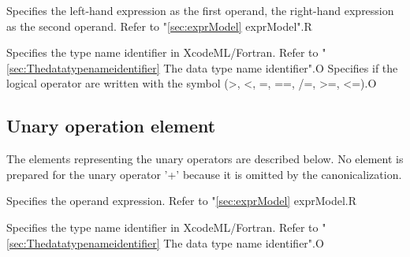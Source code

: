 
\begin{XcodeMLChildElements}
{Specifies the left-hand expression as the first operand, the right-hand expression as the second operand. Refer to "\ref{sec:exprModel} exprModel".}{R}
\end{XcodeMLChildElements}

\begin{XcodeMLAttributes}
{Specifies the type name identifier in XcodeML/Fortran.
 Refer to "\ref{sec:Thedatatypenameidentifier} The data type name identifier".}{O}
{Specifies if the logical operator are written with the symbol 
(>, <, =, ==, /=, >=, <=).}{O}
\end{XcodeMLAttributes}


\subsection{Unary operation element}

The elements representing the unary operators are described below.
No element is prepared for the unary operator '+' because it is omitted by the canonicalization.
\newline

\begin{XcodeMLOperations}
\end{XcodeMLOperations}


\begin{XcodeMLChildElements}
{Specifies the operand expression. Refer to "\ref{sec:exprModel} exprModel.}{R}
\end{XcodeMLChildElements}

\begin{XcodeMLAttributes}
{Specifies the type name identifier in XcodeML/Fortran.
 Refer to "\ref{sec:Thedatatypenameidentifier} The data type name identifier".}{O}
\end{XcodeMLAttributes}


